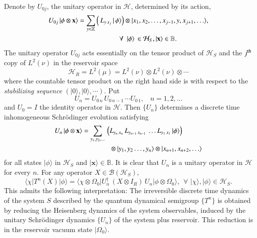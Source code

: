 Denote by $U_{0j}$, the unitary operator in $\mathcal{H}$, determined by its action, 
\begin{align} 
U_{0j}\, \vert \phi \otimes \mathbf{x}\rangle & = \sum_{y\in\mathbb{X}} \left(\, L_{y\, x_j}\, \vert\,\phi\rangle\right)\otimes \vert x_1,x_2,\ldots , x_{j-1}, y, x_{j+1},\ldots \rangle,\notag \\
& \qquad \qquad \qquad \forall\ \ \vert\phi\rangle\,\in \mathcal{H}_S, \vert\mathbf{x}\rangle\in\mathbb{B}.  \label{chap8-eq2.4}
\end{align} 
The unitary operator $U_{0j}$ acts essentially on the tensor product of $\mathcal{H}_S$ and the $j^{\rm th}$ copy of $L^2(\nu)$ in 
the reservoir space 
$$
\mathcal{H}_R=L^2(\mu)=L^2(\nu)\otimes L^2(\nu)\otimes \cdots 
$$
where the countable tensor product on the right hand side is with respect to the \textit{stabilizing sequence} 
$(\vert 0\rangle, \vert 0\rangle, \cdots )$. Put 
\begin{equation} 
U_n=U_{0\,n}\, U_{0\,n-1}\, \cdots U_{0\,1},\ \ \ \  n=1,2,\ldots  \label{chap8-eq2.5}
\end{equation}     
and $U_0=I$ the identity operator in $\mathcal{H}$. Then $\{U_n\}$ determines a discrete time inhomogeneous Schr{\"o}dinger evolution satisfying 
\begin{align}
U_n\, \vert \phi \otimes \mathbf{x}\rangle & = \sum_{y_1,y_2,\ldots}\,  \left(L_{y_n\,x_n}\, L_{y_{n-1}\,x_{n-1}}\, \ldots  L_{y_1\,x_1}\, \vert \phi\rangle\right)\notag \\ 
& \qquad \qquad \otimes \vert y_1,y_2\ldots , y_n\rangle \otimes  \vert x_{n+1},x_{n+2},\ldots \rangle  \label{chap8-eq2.6}
\end{align} 
for all states $\vert \phi\rangle$ in $\mathcal{H}_S$ and $\vert \mathbf{x}\rangle\in \mathbb{B}.$
It is clear that  $U_n$ is a unitary operator in $\mathcal{H}$ for every $n$. For any operator $X\in \mathcal{B}(\mathcal{H}_S),$  
\begin{equation} 
\langle \chi\vert T^{n}(X)\vert \phi\rangle =\langle \chi\otimes \Omega_0\vert U_n^\dag\, (X\otimes I_R)\, U_n\vert \phi\otimes \Omega_0\rangle,\ \ \forall\,\, \vert \chi\rangle,\vert \phi\rangle\in \mathcal{H}_S.  \label{chap8-eq2.7}
\end{equation}    
This admits the following interpretation: The irreversible discrete time dynamics of the system $S$ described by the quantum dynamical semigroup $\{T^n\}$ is obtained by reducing the Heisenberg dynamics of the system observables, induced by the unitary Schr{\"o}dinger dynamics $\{U_n\}$ of the system plus reservoir. This reduction is in the reservoir vacuum state $\vert \Omega_0\rangle$. 


